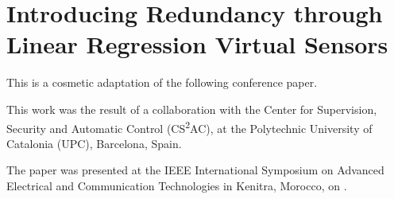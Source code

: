 
\chapter[Linear Regression Virtual Sensors]%
{Introducing Redundancy through Linear Regression Virtual Sensors}
\label{chap:publications:third-publication}

\begin{refsegment}

This  is a cosmetic adaptation of the following conference paper.


This work was the result of a collaboration with the Center for Supervision, Security and Automatic Control (CS\textsuperscript{2}AC), at the Polytechnic University of Catalonia (UPC), Barcelona, Spain.

The paper was presented at the IEEE International Symposium on Advanced Electrical and Communication Technologies in Kenitra, Morocco, on .



\iftoggle{separatebibliography}{
    \printbibliography[
        heading=subbibliography,
        segment=\therefsegment,
    ]
}{}
\end{refsegment}
